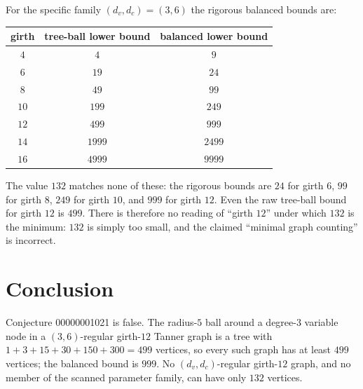 \documentclass[11pt]{article}
\theoremstyle{definition}
\theoremstyle{remark}
\begin{document}
For the specific family $(d_v,d_c)=(3,6)$ the rigorous balanced bounds are:
\begin{center}
\begin{tabular}{c c c}
\toprule
girth & tree-ball lower bound & balanced lower bound \\
\midrule
$4$  & $4$   & $9$\\
$6$  & $19$  & $24$\\
$8$  & $49$  & $99$\\
$10$ & $199$ & $249$\\
$12$ & $499$ & $999$\\
$14$ & $1999$ & $2499$\\
$16$ & $4999$ & $9999$\\
\bottomrule
\end{tabular}
\end{center}
The value $132$ matches none of these: the rigorous bounds are $24$ for girth
$6$, $99$ for girth $8$, $249$ for girth $10$, and $999$ for girth $12$.
Even the raw tree-ball bound for girth $12$ is $499$. There is therefore no
reading of ``girth $12$'' under which $132$ is the minimum: $132$ is simply
too small, and the claimed ``minimal graph counting'' is incorrect.

\section{Conclusion}

Conjecture 00000001021 is false. The radius-$5$ ball around a degree-$3$
variable node in a $(3,6)$-regular girth-$12$ Tanner graph is a tree with
$1+3+15+30+150+300=499$ vertices, so every such graph has at least $499$
vertices; the balanced bound is $999$. No $(d_v,d_c)$-regular girth-$12$
graph, and no member of the scanned parameter family, can have only $132$
vertices.
\end{document}
